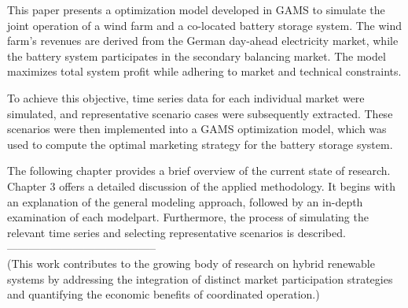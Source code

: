 This paper presents a optimization model developed in GAMS to simulate the joint operation of a
wind farm and a co-located battery storage system. The wind farm's revenues are derived from the German day-ahead
electricity market, while the battery system participates in the secondary balancing market.
The model maximizes total system profit while adhering to market and technical constraints.

To achieve this objective, time series data for each individual market were simulated,
and representative scenario cases were subsequently extracted. These scenarios were then
implemented into a GAMS optimization model, which was used to compute the optimal marketing
strategy for the battery storage system.

The following chapter provides a brief overview of the current state of research. Chapter 3 offers a detailed
discussion of the applied methodology. It begins with an explanation of the general modeling approach,
followed by an in-depth examination of each modelpart. Furthermore, the process of simulating the relevant
time series and selecting representative scenarios is described.
-----------------------------------------\\


(This work contributes to the growing body of research on hybrid renewable systems by addressing the
integration of distinct market participation strategies and quantifying the economic benefits of coordinated operation.)


